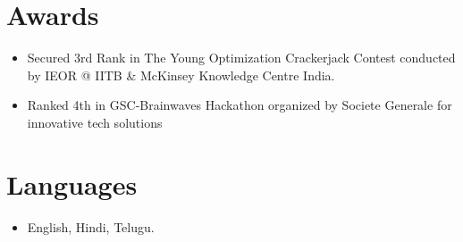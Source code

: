 \documentclass[letterpaper,11pt]{article}
\newcommand{\resumeSubItemListStart}{\begin{itemize}[leftmargin=*]}
\newcommand{\resumeSubItemListEnd}{\end{itemize}}
\begin{document}
\section{Awards}
  \resumeSubItemListStart
    \item{ {Secured 3rd Rank in The Young Optimization Crackerjack Contest conducted by IEOR @ IITB \& McKinsey Knowledge Centre India.} }
    \item{ {Ranked 4th in GSC-Brainwaves Hackathon organized by Societe Generale for innovative tech solutions} }
  \resumeSubItemListEnd

\section{Languages}
  \resumeSubItemListStart
    \item{ {English, Hindi, Telugu.} }
  \resumeSubItemListEnd

\end{document}
